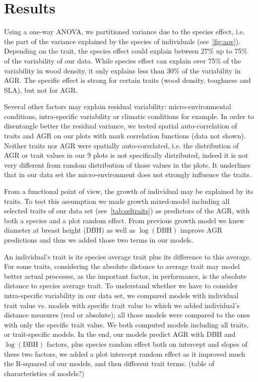 \label{sec:Res}
\section*{Results}

Using a one-way ANOVA, we partitioned variance due to the species effect, i.e. the part of the variance explained by the species of individuals (see~\autoref{fig:aov}). Depending on the trait, the species effect could explain between 27\% up to 75\% of the variability of our data. While species effect can explain over 75\% of the variability in wood density, it only explains less than 30\% of the variability in AGR. The specific effect is strong for certain traits (wood density, toughness and SLA), but not for AGR.

Several other factors may explain residual variability: micro-environmental conditions, intra-specific variability or climatic conditions for example. In order to disentangle better the residual variance, we tested spatial auto-correlation of traits and AGR on our plots with mark correlation functions (data not shown). Neither traits nor AGR were spatially auto-correlated, i.e. the distribution of AGR or trait values in our 9 plots is not specifically distributed, indeed it is not very different from random distribution of those values in the plots. It underlines that in our data set the micro-environment does not strongly influence the traits.

From a functional point of view, the growth of individual may be explained by its traits. To test this assumption we made growth mixed-model including all selected traits of our data set (see~\autoref{tab:seltraits}) as predictors of the AGR, with both a species and a plot random effect. From previous growth model \cite{NEEDED} we knew diameter at breast height (DBH) as well as $\log(\text{DBH})$ improve AGR predictions and thus we added those two terms in our models.

An individual's trait is its species average trait plus its difference to this average. For some traits, considering the absolute distance to average trait may model better actual processes, as the important factor, in performance, is the absolute distance to species average trait. To understand whether we have to consider intra-specific variability in our data set, we compared models with individual trait value vs. models with specific trait value to which we added individual's distance measures (real or absolute); all those models were compared to the ones with only the specific trait value. We both computed models including all traits, or trait-specific models. In the end, our models predict AGR with DBH and $\log(\text{DBH})$ factors, plus species random effect both on intercept and slopes of these two factors, we added a plot intercept random effect as it improved much the R-squared of our models, and then different trait terms. \missfig (table of characteristics of models?)

